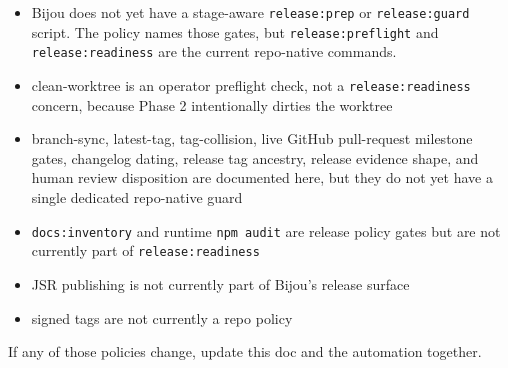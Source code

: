 \begin{itemize}
\tightlist
\item
  Bijou does not yet have a stage-aware \texttt{r\allowbreak{}e\allowbreak{}l\allowbreak{}e\allowbreak{}a\allowbreak{}s\allowbreak{}e\allowbreak{}:\allowbreak{}p\allowbreak{}r\allowbreak{}e\allowbreak{}p} or \texttt{r\allowbreak{}e\allowbreak{}l\allowbreak{}e\allowbreak{}a\allowbreak{}s\allowbreak{}e\allowbreak{}:\allowbreak{}g\allowbreak{}u\allowbreak{}a\allowbreak{}r\allowbreak{}d} script. The policy names those gates, but \texttt{r\allowbreak{}e\allowbreak{}l\allowbreak{}e\allowbreak{}a\allowbreak{}s\allowbreak{}e\allowbreak{}:\allowbreak{}p\allowbreak{}r\allowbreak{}e\allowbreak{}f\allowbreak{}l\allowbreak{}i\allowbreak{}g\allowbreak{}h\allowbreak{}t} and \texttt{r\allowbreak{}e\allowbreak{}l\allowbreak{}e\allowbreak{}a\allowbreak{}s\allowbreak{}e\allowbreak{}:\allowbreak{}r\allowbreak{}e\allowbreak{}a\allowbreak{}d\allowbreak{}i\allowbreak{}n\allowbreak{}e\allowbreak{}s\allowbreak{}s} are the current repo-native commands.
\item
  clean-worktree is an operator preflight check, not a \texttt{r\allowbreak{}e\allowbreak{}l\allowbreak{}e\allowbreak{}a\allowbreak{}s\allowbreak{}e\allowbreak{}:\allowbreak{}r\allowbreak{}e\allowbreak{}a\allowbreak{}d\allowbreak{}i\allowbreak{}n\allowbreak{}e\allowbreak{}s\allowbreak{}s} concern, because Phase 2 intentionally dirties the worktree
\item
  branch-sync, latest-tag, tag-collision, live GitHub pull-request milestone gates, changelog dating, release tag ancestry, release evidence shape, and human review disposition are documented here, but they do not yet have a single dedicated repo-native guard
\item
  \texttt{d\allowbreak{}o\allowbreak{}c\allowbreak{}s\allowbreak{}:\allowbreak{}i\allowbreak{}n\allowbreak{}v\allowbreak{}e\allowbreak{}n\allowbreak{}t\allowbreak{}o\allowbreak{}r\allowbreak{}y} and runtime \texttt{n\allowbreak{}p\allowbreak{}m\allowbreak{} \allowbreak{}a\allowbreak{}u\allowbreak{}d\allowbreak{}i\allowbreak{}t} are release policy gates but are not currently part of \texttt{r\allowbreak{}e\allowbreak{}l\allowbreak{}e\allowbreak{}a\allowbreak{}s\allowbreak{}e\allowbreak{}:\allowbreak{}r\allowbreak{}e\allowbreak{}a\allowbreak{}d\allowbreak{}i\allowbreak{}n\allowbreak{}e\allowbreak{}s\allowbreak{}s}
\item
  JSR publishing is not currently part of Bijou's release surface
\item
  signed tags are not currently a repo policy
\end{itemize}

If any of those policies change, update this doc and the automation together.

